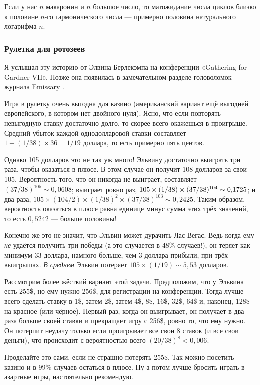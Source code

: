 Если у нас $n$ макаронин и $n$ большое число, то матожидание числа циклов близко к половине $n$-го гармонического числа --- примерно половина натурального логарифма $n$.

\subsubsection*{Рулетка для ротозеев}

Я услышал эту историю от Элвина Берлекэмпа на конференции
«Gathering for Gardner VII».
Позже она появилась в замечательном разделе головоломок журнала Emissary \cite[весна/осень 2006 года]{3}.

Игра в рулетку очень выгодна для казино (американский вариант ещё выгодней европейского, в котором нет двойного нуля).
Ясно, что если повторять невыгодную ставку достаточно долго, то скорее всего окажешься в проигрыше.
Средний убыток каждой однодолларовой ставки составляет $1 - (1/38) \times 36 = 1/19$ доллара, то есть примерно пять центов.

Однако 105 долларов это не так уж много!
Эльвину достаточно выиграть три раза, чтобы оказаться в плюсе.
В этом случае он получит 108 долларов за свои 105.
Вероятность того, что он никогда не выиграет, составляет $(37/38)^{105} \sim 0{,}0608$;
выиграет ровно раз, $105 \times (1/38) \times (37/38)^{104} \z\sim 0{,}1725$;
и два раза, $105 \times (104/2) \times (1/38)^2 \times (37/38)^{103} \sim 0{,}2425$.
Таким образом, вероятность оказаться в плюсе равна единице минус сумма этих трёх значений, то есть $0{,}5242$ --- больше половины!

Конечно же это не значит, что Эльвин может дурачить Лас-Вегас.
Ведь когда ему \emph{не} удаётся получить три победы (а это случается в 48\% случаев!), он теряет как минимум 33 доллара, намного больше, чем 3 доллара прибыли, при трёх выигрышах.
\emph{В среднем} Эльвин потеряет $105 \times (1/19) \sim 5{,}53$ долларов.

Рассмотрим более жёсткий вариант этой задачи.
Предположим, что у Эльвина есть 255\$, но ему нужно 256\$, для регистрации на конференции.
Тогда лучше всего сделать ставку в 1\$, затем 2\$, затем 4\$, 8\$, 16\$, 32\$, 64\$ и, наконец, 128\$ на красное (или чёрное).
Первый раз, когда он выигрывает, он получает в два раза больше своей ставки и прекращает игру с 256\$, ровно то, что ему нужно.
Он потерпит неудачу только если проигрывает все свои $8$ ставок (и все свои деньги), что происходит с вероятностью всего $(20/38)^8 < 0{,}006$.

Проделайте это сами, если не страшно потерять 255\$.
Так можно посетить казино и в 99\% случаев остаться в плюсе.
Ну а потом лучше бросить играть в азартные игры, настоятельно рекомендую.

